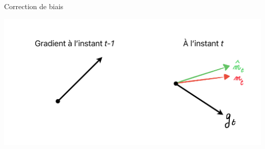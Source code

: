 \documentclass[11pt,aspectratio=169,xcolor=dvipsnames, french]{beamer}
\begin{document}
% 
% 
% 
% 
%  
% 
% 
%  
%  
% 
% 
% 
% 
%  
% 
% 

\begin{frame}{Correction de biais}
    \begin{center}
    \hspace{-1cm}
        \includegraphics[width=.9\linewidth]{../Images/Gradient2.pdf}
    \end{center}
\end{frame}
\end{document}
